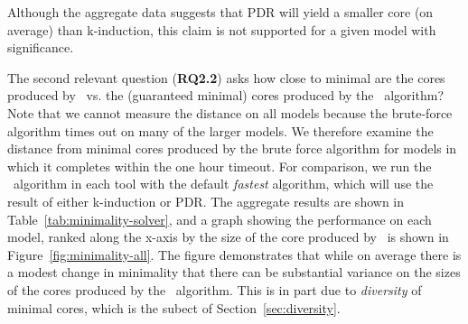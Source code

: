 
Although the aggregate data suggests that PDR will yield a smaller core (on average) than k-induction, this claim is not supported for a given model with significance.


The second relevant question (\textbf{RQ2.2}) asks how close to minimal are the cores produced by \ucalg\ vs. the (guaranteed minimal) cores produced by the \bfalg\ algorithm?  Note that we cannot measure the distance on all models because the brute-force algorithm times out on many of the larger models.  We therefore examine the distance from minimal cores produced by the brute force algorithm for models in which it completes within the one hour timeout.  For comparison, we run the \ucalg\ algorithm in each tool with the default {\em fastest} algorithm, which will use the result of either k-induction or PDR.  The aggregate results are shown in Table~\ref{tab:minimality-solver}, and a graph showing the performance on each model, ranked along the x-axis by the size of the core produced by \bfalg\ is shown in Figure~\ref{fig:minimality-all}.  The figure demonstrates that while on average there is a modest change in minimality that there can be substantial variance on the sizes of the cores produced by the \ucalg\ algorithm.  This is in part due to {\em diversity} of minimal cores, which is the subect of Section~\ref{sec:diversity}.



